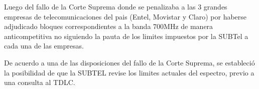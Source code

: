 Luego del fallo de la Corte Suprema donde se penalizaba a las 3 grandes empresas de telecomunicaciones del pais (Entel, Movistar y Claro) por haberse adjudicado bloques correspondientes a la banda 700MHz de manera anticompetitiva no siguiendo la pauta de los limites impuestos por la SUBTel a cada una de las empresas. 

De acuerdo a una de las disposiciones del fallo de la Corte Suprema, se estableció la posibilidad de que la SUBTEL revise los limites actuales del espectro, previo a una consulta al TDLC. 







